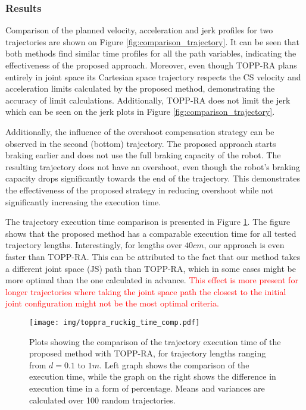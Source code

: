 \subsubsection*{Results} Comparison of the planned velocity, acceleration and jerk profiles for two trajectories are shown on Figure \ref{fig:comparison_trajectory}. It can be seen that both methods find similar time profiles for all the path variables, indicating the effectiveness of the proposed approach. Moreover, even though TOPP-RA plans entirely in joint space its Cartesian space trajectory respects the CS velocity and acceleration limits calculated by the proposed method, demonstrating the accuracy of limit calculations. Additionally, TOPP-RA does not limit the jerk which can be seen on the jerk plots in Figure \ref{fig:comparison_trajectory}.

Additionally, the influence of the overshoot compensation strategy can be observed in the second (bottom) trajectory. The proposed approach starts braking earlier and does not use the full braking capacity of the robot. The resulting trajectory does not have an overshoot, even though the robot's braking capacity drops significantly towards the end of the trajectory. This demonstrates the effectiveness of the proposed strategy in reducing overshoot while not significantly increasing the execution time.

The trajectory execution time comparison is presented in Figure \ref{fig:comparison_time}. The figure shows that the proposed method has a comparable execution time for all tested trajectory lengths. Interestingly, for lengths over $40cm$, our approach is even faster than TOPP-RA. This can be attributed to the fact that our method takes a different joint space (JS) path than TOPP-RA, which in some cases might be more optimal than the one calculated in advance. 
\textcolor{red}{This effect is more present for longer trajectories where taking the joint space path the closest to the initial joint configuration might not be the most optimal criteria. }



\begin{figure}[!t]
    \centering
    \texttt{[image: img/toppra\_ruckig\_time\_comp.pdf]}
    \caption{Plots showing the comparison of the trajectory execution time of the proposed method with TOPP-RA, for trajectory lengths ranging from $d=0.1$ to $1m$. Left graph shows the comparison of the execution time, while the graph on the right shows the difference in execution time in a form of percentage. Means and variances are calculated over 100 random trajectories.}
    \label{fig:comparison_time}
\end{figure}
